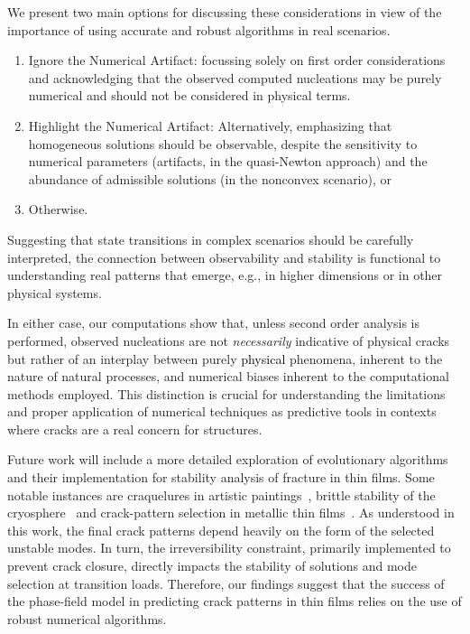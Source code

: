 We present two main options for discussing these considerations in view of the importance of using accurate and robust algorithms in real scenarios.

\begin{enumerate}
    \item 
    Ignore the Numerical Artifact: focussing solely on first order considerations and acknowledging that the observed computed nucleations may be purely numerical and should not be considered in physical terms.
    \item 
    Highlight the Numerical Artifact: Alternatively, emphasizing that homogeneous solutions should be observable, despite 
    the sensitivity to numerical parameters (artifacts, in the quasi-Newton approach) and the abundance of admissible solutions (in the nonconvex scenario), or
    \item 
    Otherwise.
\end{enumerate}

Suggesting that state transitions in complex scenarios should be carefully interpreted, the connection between observability and stability is functional to understanding real patterns that emerge, e.g., in higher dimensions or in other physical systems.

In either case, our computations show that, unless second order analysis is performed, observed nucleations are not \emph{necessarily} indicative of physical cracks but rather of an interplay between purely   \textcolor{black}{physical} phenomena, inherent to the nature of natural processes, and numerical biases inherent to the computational methods employed. This distinction is crucial for understanding the limitations and proper application of numerical techniques as predictive tools in contexts where cracks are a real concern for structures.


Future work will include a more detailed exploration of evolutionary algorithms and their implementation for stability analysis of fracture in thin films. Some notable instances are craquelures in artistic paintings~\cite{fuster-lopez:2020-picassos, Bosco:2020aa,Bosco:2021},  brittle stability of the cryosphere~\cite{weiss:2017-linking, tollefson:2017-giant, Sun:2023aa, Millan:2023aa} and crack-pattern selection in metallic thin films~\cite{Faurie2019-to}. {As understood in this work, the final crack patterns depend heavily on the form of the selected unstable modes. In turn, the irreversibility constraint, primarily implemented to prevent crack closure, directly impacts the stability of solutions and mode selection at transition loads. Therefore, our findings suggest that the success of the phase-field model in predicting crack patterns in thin films relies on the use of robust numerical algorithms.}


